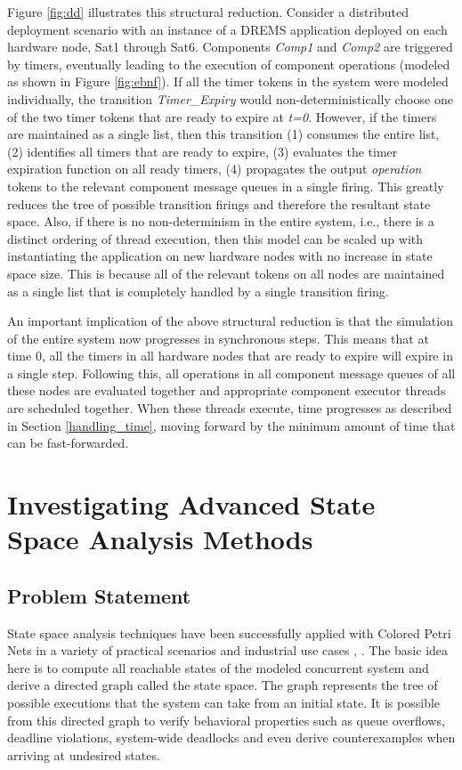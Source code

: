 Figure \ref{fig:dd} illustrates this structural reduction. Consider a distributed deployment scenario with an instance of a DREMS application deployed on each hardware node, Sat1 through Sat6. Components \emph{Comp1} and \emph{Comp2} are triggered by timers, eventually leading to the execution of component operations (modeled as shown in Figure \ref{fig:ebnf}). If all the timer tokens in the system were modeled individually, the transition \emph{Timer\_Expiry} would non-deterministically choose one of the two timer tokens that are ready to expire at \emph{t=0}. However, if the timers are maintained as a single list, then this transition (1) consumes the entire list, (2) identifies all timers that are ready to expire, (3) evaluates the timer expiration function on all ready timers, (4) propagates the output \emph{operation} tokens to the relevant component message queues in a single firing. This greatly reduces the tree of possible transition firings and therefore the resultant state space. Also, if there is no non-determinism in the entire system, i.e., there is a distinct ordering of thread execution, then this model can be scaled up with instantiating the application on new hardware nodes with no increase in state space size. This is because all of the relevant tokens on all nodes are maintained as a single list that is completely handled by a single transition firing. 

An important implication of the above structural reduction is that the simulation of the entire system now progresses in synchronous steps. This means that at time 0, all the timers in all hardware nodes that are ready to expire will expire in a single step. Following this, all operations in all component message queues of all these nodes are evaluated together and appropriate component executor threads are scheduled together. When these threads execute, time progresses as described in Section \ref{handling_time}, moving forward by the minimum amount of time that can be fast-forwarded.
\fi

\newpage
\section{Investigating Advanced State Space Analysis Methods}

\subsection{Problem Statement}
State space analysis techniques have been successfully applied with Colored Petri Nets in a variety of practical scenarios and industrial use cases \cite{CPN_0}, \cite{CPN_1}. The basic idea here is to compute all reachable states of the modeled concurrent system and derive a directed graph called the state space. The graph represents the tree of possible executions that the system can take from an initial state. It is possible from this directed graph to verify behavioral properties such as queue overflows, deadline violations, system-wide deadlocks and even derive counterexamples when arriving at undesired states. 

